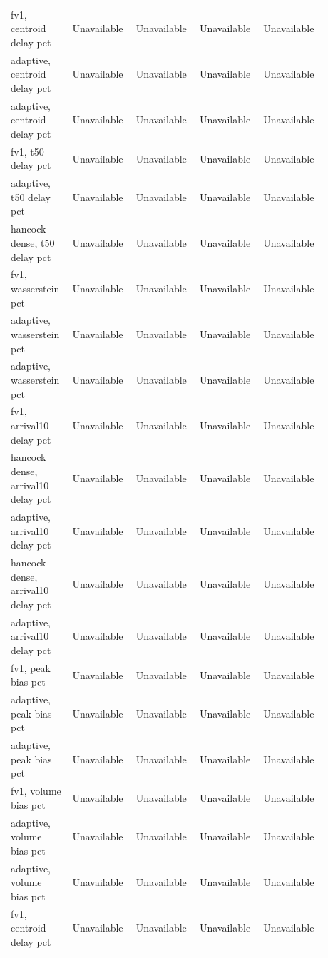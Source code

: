 \begin{longtable}{p{0.1760\linewidth}p{0.1760\linewidth}p{0.1760\linewidth}p{0.1760\linewidth}p{0.1760\linewidth}}
fv1, centroid delay pct & Unavailable & Unavailable & Unavailable & Unavailable \\
adaptive, centroid delay pct & Unavailable & Unavailable & Unavailable & Unavailable \\
adaptive, centroid delay pct & Unavailable & Unavailable & Unavailable & Unavailable \\
fv1, t50 delay pct & Unavailable & Unavailable & Unavailable & Unavailable \\
adaptive, t50 delay pct & Unavailable & Unavailable & Unavailable & Unavailable \\
hancock dense, t50 delay pct & Unavailable & Unavailable & Unavailable & Unavailable \\
fv1, wasserstein pct & Unavailable & Unavailable & Unavailable & Unavailable \\
adaptive, wasserstein pct & Unavailable & Unavailable & Unavailable & Unavailable \\
adaptive, wasserstein pct & Unavailable & Unavailable & Unavailable & Unavailable \\
fv1, arrival10 delay pct & Unavailable & Unavailable & Unavailable & Unavailable \\
hancock dense, arrival10 delay pct & Unavailable & Unavailable & Unavailable & Unavailable \\
adaptive, arrival10 delay pct & Unavailable & Unavailable & Unavailable & Unavailable \\
hancock dense, arrival10 delay pct & Unavailable & Unavailable & Unavailable & Unavailable \\
adaptive, arrival10 delay pct & Unavailable & Unavailable & Unavailable & Unavailable \\
fv1, peak bias pct & Unavailable & Unavailable & Unavailable & Unavailable \\
adaptive, peak bias pct & Unavailable & Unavailable & Unavailable & Unavailable \\
adaptive, peak bias pct & Unavailable & Unavailable & Unavailable & Unavailable \\
fv1, volume bias pct & Unavailable & Unavailable & Unavailable & Unavailable \\
adaptive, volume bias pct & Unavailable & Unavailable & Unavailable & Unavailable \\
adaptive, volume bias pct & Unavailable & Unavailable & Unavailable & Unavailable \\
fv1, centroid delay pct & Unavailable & Unavailable & Unavailable & Unavailable \\

\end{longtable}
